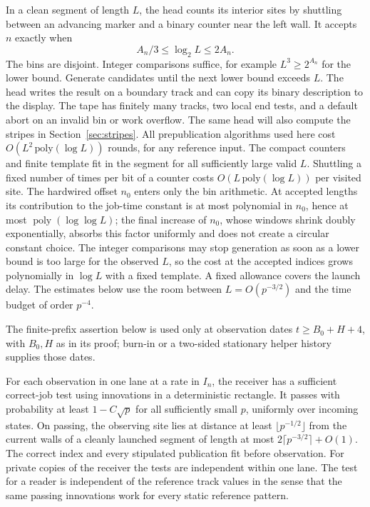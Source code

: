 In a clean segment of length \(L\), the head counts its interior sites by shuttling between an advancing marker and a binary counter near the left wall. It accepts \(n\) exactly when
\[
A_n/3\le\log_2 L\le 2A_n.
\]
The bins are disjoint. Integer comparisons suffice, for example \(L^3\ge2^{A_n}\) for the lower bound. Generate candidates until the next lower bound exceeds \(L\). The head writes the result on a boundary track and can copy its binary description to the display. The tape has finitely many tracks, two local end tests, and a default abort on an invalid bin or work overflow. The same head will also compute the stripes in Section~\ref{sec:stripes}. All prepublication algorithms used here cost \(O(L^2\,\mathrm{poly}(\log L))\) rounds, for any reference input. The compact counters and finite template fit in the segment for all sufficiently large valid \(L\). Shuttling a fixed number of times per bit of a counter costs \(O(L\,\mathrm{poly}(\log L))\) per visited site. The hardwired offset \(n_0\) enters only the bin arithmetic. At accepted lengths its contribution to the job-time constant is at most polynomial in \(n_0\), hence at most \(\operatorname{poly}(\log\log L)\); the final increase of \(n_0\), whose windows shrink doubly exponentially, absorbs this factor uniformly and does not create a circular constant choice. The integer comparisons may stop generation as soon as a lower bound is too large for the observed \(L\), so the cost at the accepted indices grows polynomially in \(\log L\) with a fixed template. A fixed allowance covers the launch delay. The estimates below use the room between \(L=O(p^{-3/2})\) and the time budget of order \(p^{-4}\).

The finite-prefix assertion below is used only at observation dates \(t\ge B_0+H+4\), with \(B_0,H\) as in its proof; burn-in or a two-sided stationary helper history supplies those dates.
\begin{lemma}\label{lem:reader}
For each observation in one lane at a rate in \(I_n\), the receiver has a sufficient correct-job test using innovations in a deterministic rectangle. It passes with probability at least \(1-C\sqrt p\) for all sufficiently small \(p\), uniformly over incoming states. On passing, the observing site lies at distance at least \(\lfloor p^{-1/2}\rfloor\) from the current walls of a cleanly launched segment of length at most \(2\lceil p^{-3/2}\rceil+O(1)\). The correct index and every stipulated publication fit before observation. For private copies of the receiver the tests are independent within one lane. The test for a reader is independent of the reference track values in the sense that the same passing innovations work for every static reference pattern.
\end{lemma}

